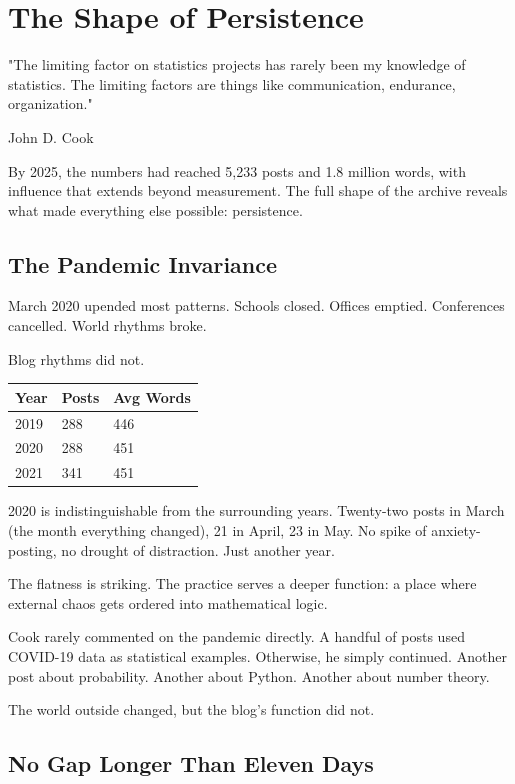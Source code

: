 \chapter{The Shape of Persistence}

\nopagebreak
\epigraph{"The limiting factor on statistics projects has rarely been my knowledge of statistics. The limiting factors are things like communication, endurance, organization."}{John D. Cook}
\nopagebreak

By 2025, the numbers had reached 5,233 posts and 1.8 million words, with influence that extends beyond measurement. The full shape of the archive reveals what made everything else possible: persistence.

\bigskip

\section*{The Pandemic Invariance}

March 2020 upended most patterns. Schools closed. Offices emptied. Conferences cancelled. World rhythms broke.

Blog rhythms did not.

\begin{longtable}{p{3.00cm}p{3.00cm}p{3.00cm}}
\toprule
\textbf{Year} & \textbf{Posts} & \textbf{Avg Words} \tabularnewline
\midrule
2019 & 288 & 446 \tabularnewline
2020 & 288 & 451 \tabularnewline
2021 & 341 & 451 \tabularnewline
\bottomrule
\end{longtable}

2020 is indistinguishable from the surrounding years. Twenty-two posts in March (the month everything changed), 21 in April, 23 in May. No spike of anxiety-posting, no drought of distraction. Just another year.

The flatness is striking. The practice serves a deeper function: a place where external chaos gets ordered into mathematical logic.

Cook rarely commented on the pandemic directly. A handful of posts used COVID-19 data as statistical examples. Otherwise, he simply continued. Another post about probability. Another about Python. Another about number theory.

The world outside changed, but the blog's function did not.

\bigskip

\section*{No Gap Longer Than Eleven Days}


